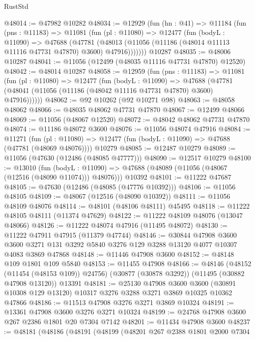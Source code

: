 \begin{lexlean}{RustStd}
\begin{coremodule}
@48014 := @47982 @10282
@48034 := @12929
    (fun (hn : @41) =>
    @11184
      (fun (pns : @11183) =>
      @11081
        (fun (pl : @11080) =>
        @12477
          (fun (bodyL : @11090) =>
          @47688
            (@47781
              (@48013 (@11056 (@11186 (@48014 @11113 @11116 @47731 @47870) @3600) @47916)))))))
    @10287
@48035 := @48006 @10287
@48041 := @11056 (@12499 (@48035 @11116 @47731 @47870) @12520)
@48042 := @48014 @10287
@48058 := @12959
    (fun (pns : @11183) =>
    @11081
      (fun (pl : @11080) =>
      @12477
        (fun (bodyL : @11090) =>
        @47688 (@47781 (@48041 (@11056 (@11186 (@48042 @11116 @47731 @47870) @3600) @47916))))))
@48062 := @92 @10262 (@92 @10271 @98)
@48063 := @48058 @48062
@48066 := @48035 @48062 @47731 @47870
@48067 := @12499 @48066
@48069 := @11056 (@48067 @12520)
@48072 := @48042 @48062 @47731 @47870
@48074 := @11186 @48072 @3600
@48076 := @11056 @48074 @47916
@48084 := @11271
    (fun (pl : @11080) => @12477 (fun (bodyL : @11090) => @47688 (@47781 (@48069 @48076))))
    @10279
@48085 := @12487 @10279
@48089 := @11056 (@47630 (@12486 (@48085 @47777)))
@48090 := @12517 @10279
@48100 := @13010
    (fun (bodyL : @11090) => @47688 (@48089 (@11056 (@48067 (@12516 (@48090 @11074))) @48076)))
    @10392
@48101 := @11222 @47687
@48105 := @47630 (@12486 (@48085 (@47776 @10392)))
@48106 := @11056 @48105
@48109 := @48067 (@12516 (@48090 @10392))
@48111 := @11056 @48109 @48076
@48114 := @48101 (@48106 @48111) @45495
@48118 := @11222 @48105 @48111 (@11374 @47629)
@48122 := @11222 @48109 @48076 (@13047 @48066)
@48126 := @11222 @48074 @47916 (@11495 @48072)
@48130 := @11222 @47911 @47915 (@11379 @47744)
@48146 := @30844
    @47908
    @3600
    @3600
    @3271
    @131
    @3292
    @5840
    @3276
    @129
    @3288
    @13120
    @4077
    @10307
    @4083
    @3869
    @47868
@48148 := @11446 @47908 @3600
@48152 := @48148 @109 @1801 @109 @5840
@48153 := @11455 @47908
@48166 := @48146
    (@48152 (@11454 (@48153 @109)) @24756)
    (@30877 (@30878 @3292))
    (@11495 (@30882 @47908 @13120))
    @13391
@48181 := @25130
    @47908
    @3600
    @3600
    (@30891 @10308 @129 @13120)
    @10317
    @3276
    @3288
    @3271
    @3869
    @10325
    @10362
    @47866
@48186 := @11513 @47908 @3276 @3271 @3869 @10324
@48191 := @13361 @47908 @3600 @3276 @3271 @10324
@48199 := @24768 @47908 @3600 @267 @2386 @1801 @20 @7304 @7142
@48201 := @11434 @47908 @3600
@48237 := @48181
    (@48186
      (@48191
        (@48199
          (@48201
            @267
            @2388
            @1801
            @2000
            @7304

\end{coremodule}
\end{lexlean}
